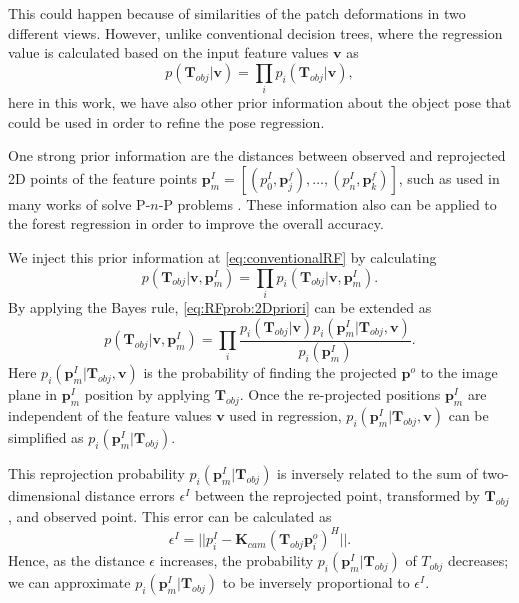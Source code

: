 \documentclass[annual]{acmsiggraph}
\begin{document}
This could happen because of similarities of the patch deformations in two different views. However, unlike conventional decision trees, where the regression value is calculated based on the input feature values $\mathbf{v}$ as  
\begin{equation}
p(\mathbf{T}_{obj}|\mathbf{v}) = \prod_{i} p_i(\mathbf{T}_{obj}|\mathbf{v}),
\label{eq:conventionalRF}
\end{equation}
here in this work, we have also other prior information about the object pose that could be used in order to refine the pose regression. 

One strong prior information are the distances between observed and reprojected 2D points of the feature points $\mathbf{p}^I_{m} = [(p^I_0, \mathbf{p}^f_j), \ldots, (p^I_n, \mathbf{p}^f_k)]$, such as used in many works of solve P-$n$-P problems \cite{Lepetit:2009,Li:2012}. These information also can be applied to the forest regression in order to improve the overall accuracy.

We inject this prior information at \eqref{eq:conventionalRF} by calculating
\begin{equation}
p(\mathbf{T}_{obj}|\mathbf{v}, \mathbf{p}^I_m) = \prod_{i} p_i(\mathbf{T}_{obj}|\mathbf{v}, \mathbf{p}^I_m).
\label{eq:RFprob:2Dpriori}
\end{equation}
By applying the Bayes rule, \eqref{eq:RFprob:2Dpriori} can be extended as
\begin{equation}
p(\mathbf{T}_{obj}|\mathbf{v}, \mathbf{p}^I_m) = \prod_{i} \frac{p_i(\mathbf{T}_{obj}|\mathbf{v})p_i(\mathbf{p}^I_m|\mathbf{T}_{obj},\mathbf{v})}{p_i(\mathbf{p}^I_m)}.
\label{eq:RFprob:bayes}
\end{equation}
Here $p_i(\mathbf{p}^I_m|\mathbf{T}_{obj},\mathbf{v})$ is the probability of finding the projected $\mathbf{p}^o$ to the image plane in $\mathbf{p}^I_m$ position by applying $\mathbf{T}_{obj}$. Once the re-projected positions $\mathbf{p}^I_m$ are independent of the feature values $\mathbf{v}$ used in regression, $p_i(\mathbf{p}^I_m|\mathbf{T}_{obj},\mathbf{v})$ can be simplified as $p_i(\mathbf{p}^I_m|\mathbf{T}_{obj})$. 

This reprojection probability $p_i(\mathbf{p}^I_m|\mathbf{T}_{obj})$ is inversely related to the sum of two-dimensional distance errors $\epsilon^{I}$ between the reprojected point, transformed by $\mathbf{T}_{obj}$, and observed point. This error can be calculated as
\begin{equation}
\epsilon^{I} = ||p^I_i - \mathbf{K}_{cam}(\mathbf{T}_{obj}\mathbf{p}^o_i)^H||.
\label{eq:epsilonI}
\end{equation}
Hence, as the distance $\epsilon$ increases, the probability $p_i(\mathbf{p}^I_m|\mathbf{T}_{obj})$ of $T_{obj}$ decreases; we can approximate $p_i(\mathbf{p}^I_m|\mathbf{T}_{obj})$ to be inversely proportional to $\epsilon^I$.
\end{document}
